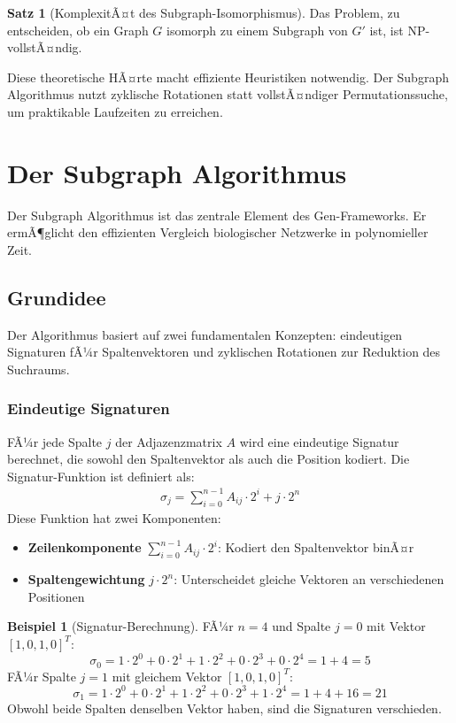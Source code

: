 ﻿\documentclass[a4paper,12pt]{article}
\theoremstyle{definition}
\newtheorem{beispiel}{Beispiel}
\newtheorem{satz}{Satz}
\begin{document}
\begin{satz}[KomplexitÃ¤t des Subgraph-Isomorphismus]
	Das Problem, zu entscheiden, ob ein Graph $G$ isomorph zu einem Subgraph von $G'$ ist, ist NP-vollstÃ¤ndig.
\end{satz}

Diese theoretische HÃ¤rte macht effiziente Heuristiken notwendig. Der Subgraph Algorithmus nutzt zyklische Rotationen statt vollstÃ¤ndiger Permutationssuche, um praktikable Laufzeiten zu erreichen.

\section{Der Subgraph Algorithmus}

Der Subgraph Algorithmus ist das zentrale Element des Gen-Frameworks. Er ermÃ¶glicht den effizienten Vergleich biologischer Netzwerke in polynomieller Zeit.

\subsection{Grundidee}

Der Algorithmus basiert auf zwei fundamentalen Konzepten: eindeutigen Signaturen fÃ¼r Spaltenvektoren und zyklischen Rotationen zur Reduktion des Suchraums.

\subsubsection{Eindeutige Signaturen}

FÃ¼r jede Spalte $j$ der Adjazenzmatrix $A$ wird eine eindeutige Signatur berechnet, die sowohl den Spaltenvektor als auch die Position kodiert. Die Signatur-Funktion ist definiert als:
\begin{align}
	\sigma_j = \sum_{i=0}^{n-1} A_{ij} \cdot 2^i + j \cdot 2^n
\end{align}
Diese Funktion hat zwei Komponenten:
\begin{itemize}
	\item[-] \textbf{Zeilenkomponente} $\sum_{i=0}^{n-1} A_{ij} \cdot 2^i$: Kodiert den Spaltenvektor binÃ¤r
	\item[-] \textbf{Spaltengewichtung} $j \cdot 2^n$: Unterscheidet gleiche Vektoren an verschiedenen Positionen
\end{itemize}

\begin{beispiel}[Signatur-Berechnung]
	FÃ¼r $n=4$ und Spalte $j=0$ mit Vektor $[1, 0, 1, 0]^T$:
	\[
	\sigma_0 = 1 \cdot 2^0 + 0 \cdot 2^1 + 1 \cdot 2^2 + 0 \cdot 2^3 + 0 \cdot 2^4 = 1 + 4 = 5
	\]
	FÃ¼r Spalte $j=1$ mit gleichem Vektor $[1, 0, 1, 0]^T$:
	\[
	\sigma_1 = 1 \cdot 2^0 + 0 \cdot 2^1 + 1 \cdot 2^2 + 0 \cdot 2^3 + 1 \cdot 2^4 = 1 + 4 + 16 = 21
	\]
	Obwohl beide Spalten denselben Vektor haben, sind die Signaturen verschieden.
\end{beispiel}
\end{document}
